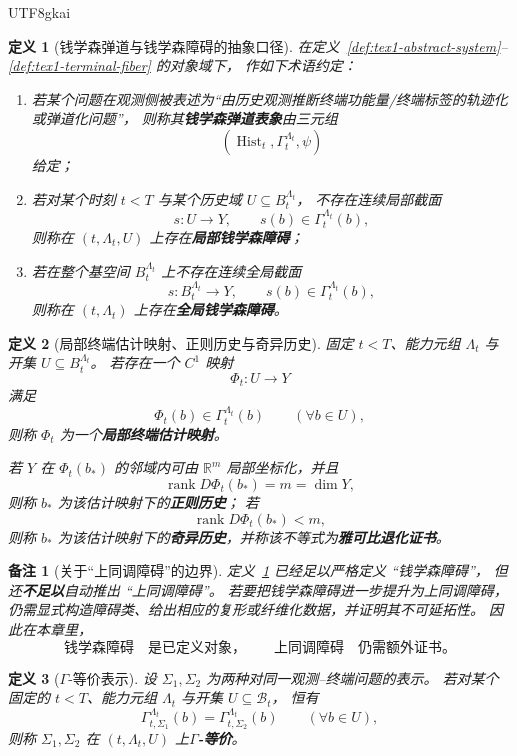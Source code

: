 \documentclass[12pt]{article}
\newtheorem{definition}{定义}[section]
\newtheorem{remark}{备注}[section]
\newcommand{\RR}{\mathbb{R}}
\newcommand{\Hist}{\operatorname{Hist}}
\begin{document}
\begin{CJK*}{UTF8}{gkai}
\begin{definition}[钱学森弹道与钱学森障碍的抽象口径]
\label{def:tex1-qxs-terms}
在定义~\ref{def:tex1-abstract-system}--\ref{def:tex1-terminal-fiber} 的对象域下，
作如下术语约定：
\begin{enumerate}
  \item 若某个问题在观测侧被表述为“由历史观测推断终端功能量/终端标签的轨迹化或弹道化问题”，
  则称其\textbf{钱学森弹道表象}由三元组
  \[
    (\Hist_t,\Gamma_t^{\Lambda_t},\psi)
  \]
  给定；
  \item 若对某个时刻 $t<T$ 与某个历史域 $U\subseteq B_t^{\Lambda_t}$，
  不存在连续局部截面
  \[
    s:U\to Y,\qquad s(b)\in\Gamma_t^{\Lambda_t}(b),
  \]
  则称在 $(t,\Lambda_t,U)$ 上存在\textbf{局部钱学森障碍}；
  \item 若在整个基空间 $B_t^{\Lambda_t}$ 上不存在连续全局截面
  \[
    s:B_t^{\Lambda_t}\to Y,\qquad s(b)\in\Gamma_t^{\Lambda_t}(b),
  \]
  则称在 $(t,\Lambda_t)$ 上存在\textbf{全局钱学森障碍}。
\end{enumerate}
\end{definition}

\begin{definition}[局部终端估计映射、正则历史与奇异历史]
\label{def:tex1-local-estimator}
固定 $t<T$、能力元组 $\Lambda_t$ 与开集 $U\subseteq B_t^{\Lambda_t}$。
若存在一个 $C^1$ 映射
\[
  \Phi_t:U\to Y
\]
满足
\[
  \Phi_t(b)\in\Gamma_t^{\Lambda_t}(b)
  \qquad
  (\forall b\in U),
\]
则称 $\Phi_t$ 为一个\textbf{局部终端估计映射}。

若 $Y$ 在 $\Phi_t(b_\ast)$ 的邻域内可由 $\RR^m$ 局部坐标化，并且
\[
  \operatorname{rank}D\Phi_t(b_\ast)=m=\dim Y,
\]
则称 $b_\ast$ 为该估计映射下的\textbf{正则历史}；
若
\[
  \operatorname{rank}D\Phi_t(b_\ast)<m,
\]
则称 $b_\ast$ 为该估计映射下的\textbf{奇异历史}，并称该不等式为\textbf{雅可比退化证书}。
\end{definition}

\begin{remark}[关于“上同调障碍”的边界]
定义~\ref{def:tex1-qxs-terms} 已经足以严格定义 ``钱学森障碍''，
但还\textbf{不足以}自动推出 ``上同调障碍''。
若要把钱学森障碍进一步提升为上同调障碍，
仍需显式构造障碍类、给出相应的复形或纤维化数据，并证明其不可延拓性。
因此在本章里，
\[
  \text{钱学森障碍}
  \quad\text{是已定义对象，}
  \qquad
  \text{上同调障碍}
  \quad\text{仍需额外证书。}
\]
\end{remark}

\begin{definition}[\texorpdfstring{$\Gamma$}{Gamma}-等价表示]
\label{def:tex1-gamma-equivalent}
设 $\Sigma_1,\Sigma_2$ 为两种对同一观测--终端问题的表示。
若对某个固定的 $t<T$、能力元组 $\Lambda_t$ 与开集 $U\subseteq \mathcal B_t$，
恒有
\[
  \Gamma_{t,\Sigma_1}^{\Lambda_t}(b)
  =
  \Gamma_{t,\Sigma_2}^{\Lambda_t}(b)
  \qquad
  (\forall b\in U),
\]
则称 $\Sigma_1,\Sigma_2$ 在 $(t,\Lambda_t,U)$ 上\textbf{\(\Gamma\)-等价}。
\end{definition}


\end{CJK*}
\end{document}
